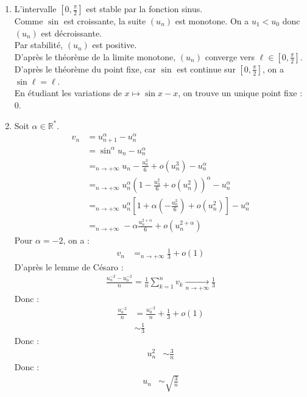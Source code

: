 \documentclass[../main.tex]{subfiles}
\begin{document}
\begin{enumerate}
    \item L'intervalle $[0, \frac{\pi}{2}]$ est stable par la fonction sinus. \\
    Comme $\sin$ est croissante, la suite $(u_n)$ est monotone. On a $u_1 < u_0$ donc $(u_n)$ est décroissante. \\
    Par stabilité, $(u_n)$ est positive. \\
    D'après le théorème de la limite monotone, $(u_n)$ converge vers $\ell \in [0, \frac{\pi}{2}]$. \\
    D'après le théorème du point fixe, car $\sin$ est continue sur $[0, \frac{\pi}{2}]$, on a $\sin \ell = \ell$. \\
    En étudiant les variations de $x\mapsto \sin x - x$, on trouve un unique point fixe : $0$. 

    \item Soit $\alpha \in \mathbb{R}^*$. 
    \begin{align*}
        v_n &= u_{n+1}^\alpha - u_n^\alpha \\
        &= \sin^\alpha u_n - u_n^\alpha \\
        &=_{n\to +\infty} u_n - \frac{u_n^3}{6} + o(u_n^3) - u_n^\alpha \\
        &=_{n\to +\infty} u_n^\alpha \left(1 - \frac{u_n^2}{6} + o(u_n^2)\right)^\alpha - u_n^\alpha \\
        &=_{n\to +\infty} u_n^\alpha \left[1 + \alpha \left(-\frac{u_n^2}{6}\right) + o(u_n^2)\right] - u_n^\alpha \\
        &=_{n\to +\infty} -\alpha \frac{u_n^{2 + \alpha}}{6} + o(u_n^{2 + \alpha})
    \end{align*}
    Pour $\alpha = -2$, on a : 
    \begin{align*}
        v_n &=_{n\to +\infty} \frac{1}{3} + o(1)
    \end{align*}
    D'après le lemme de Césaro : 
    \begin{align*}
        \frac{u_n^{-2} - u_0^{-2}}{n} = \frac{1}{n} \sum_{k=1}^{n} v_k \underset{n \to +\infty}{\longrightarrow} \frac{1}{3}
    \end{align*}
    Donc :
    \begin{align*}
        \frac{u_n^{-2}}{n} &= \frac{u_0^{-2}}{n} + \frac{1}{3} + o(1) \\
        &\sim \frac{1}{3}
    \end{align*}
    Donc : 
    \begin{align*}
        u_n^2 &\sim \frac{3}{n}
    \end{align*}
    Donc : 
    \begin{align*}
        u_n &\sim \sqrt{\frac{3}{n}}
    \end{align*}
\end{enumerate}
\end{document}
